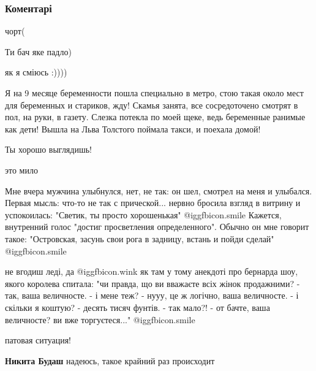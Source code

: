  
 
 
 
 
\subsubsection{Коментарі}

\begin{itemize} %
чорт(

Ти бач яке падло)

як я сміюсь :))))


Я на 9 месяце беременности пошла специально в метро, стою такая около мест для
беременных и стариков, жду! Скамья занята, все сосредоточено смотрят в пол, на
руки, в газету. Слезка потекла по моей щеке, ведь беременные ранимые как дети!
Вышла на Льва Толстого поймала такси, и поехала домой!


Ты хорошо выглядишь!

это мило


Мне вчера мужчина улыбнулся, нет, не так: он шел, смотрел на меня и улыбался.
Первая мысль: что-то не так с прической... нервно бросила взгляд в витрину и
успокоилась: "Светик, ты просто хорошенькая" @igg{fbicon.smile}  Кажется, внутренний голос
"достиг просветления определенного". Обычно он мне говорит такое: "Островская,
засунь свои рога в задницу, встань и пойди сделай" @igg{fbicon.smile} 


не вгодиш леді, да  @igg{fbicon.wink}  як там у тому анекдоті про бернарда шоу, якого королева
спитала: "чи правда, що ви вважаєте всіх жінок продажними? - так, ваша
величносте. - і мене теж? - нууу, це ж логічно, ваша величносте. - і скільки я
коштую? - десять тисяч фунтів. - так мало?! - от бачте, ваша величносте? ви вже
торгуєтеся..."  @igg{fbicon.smile} 

патовая ситуация!

\textbf{Никита Будаш} надеюсь, такое крайний раз происходит


\end{itemize}
